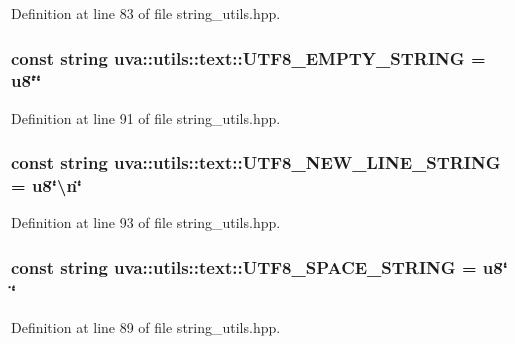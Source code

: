 Definition at line 83 of file string\+\_\+utils.\+hpp.

\hypertarget{namespaceuva_1_1utils_1_1text_aefec72a4c1fc4a009158c9786313c600}{}
\subsubsection[{U\+T\+F8\+\_\+\+E\+M\+P\+T\+Y\+\_\+\+S\+T\+R\+I\+N\+G}]{\setlength{\rightskip}{0pt plus 5cm}const string uva\+::utils\+::text\+::\+U\+T\+F8\+\_\+\+E\+M\+P\+T\+Y\+\_\+\+S\+T\+R\+I\+N\+G = u8\char`\"{}\char`\"{}}\label{namespaceuva_1_1utils_1_1text_aefec72a4c1fc4a009158c9786313c600}


Definition at line 91 of file string\+\_\+utils.\+hpp.

\hypertarget{namespaceuva_1_1utils_1_1text_a08ef26fd371b00d8de4392cbb8babe50}{}
\subsubsection[{U\+T\+F8\+\_\+\+N\+E\+W\+\_\+\+L\+I\+N\+E\+\_\+\+S\+T\+R\+I\+N\+G}]{\setlength{\rightskip}{0pt plus 5cm}const string uva\+::utils\+::text\+::\+U\+T\+F8\+\_\+\+N\+E\+W\+\_\+\+L\+I\+N\+E\+\_\+\+S\+T\+R\+I\+N\+G = u8\char`\"{}\textbackslash{}n\char`\"{}}\label{namespaceuva_1_1utils_1_1text_a08ef26fd371b00d8de4392cbb8babe50}


Definition at line 93 of file string\+\_\+utils.\+hpp.

\hypertarget{namespaceuva_1_1utils_1_1text_a89220e4cf853e111e1df3821b93fdb88}{}
\subsubsection[{U\+T\+F8\+\_\+\+S\+P\+A\+C\+E\+\_\+\+S\+T\+R\+I\+N\+G}]{\setlength{\rightskip}{0pt plus 5cm}const string uva\+::utils\+::text\+::\+U\+T\+F8\+\_\+\+S\+P\+A\+C\+E\+\_\+\+S\+T\+R\+I\+N\+G = u8\char`\"{} \char`\"{}}\label{namespaceuva_1_1utils_1_1text_a89220e4cf853e111e1df3821b93fdb88}


Definition at line 89 of file string\+\_\+utils.\+hpp.

